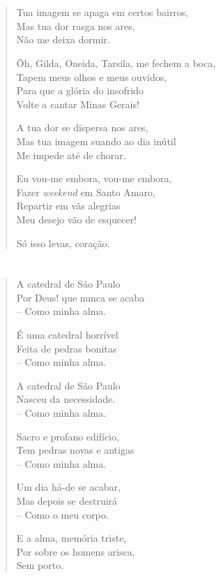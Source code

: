 \chapter*{}

\begin{verse}
Tua imagem se apaga em certos bairros,\\
Mas tua dor rasga nos ares,\\
Não me deixa dormir.

Ôh, Gilda, Oneida, Tarsila, me fechem a boca,\\
Tapem meus olhos e meus ouvidos,\\
Para que a glória do insofrido\\
Volte a cantar Minas Gerais!

A tua dor se dispersa nos ares,\\
Mas tua imagem suando ao dia inútil\\
Me impede até de chorar.

Eu vou-me embora, vou-me embora,\\
Fazer \emph{weekend} em Santo Amaro,\\
Repartir em vãs alegrias\\
Meu desejo vão de esquecer!

Só isso levas, coração.
\end{verse}

\chapter*{}

\begin{verse}
A catedral de São Paulo\\
Por Deus! que nunca se acaba\\
-- Como minha alma.

É uma catedral horrível\\
Feita de pedras bonitas\\
-- Como minha alma.

A catedral de São Paulo\\
Nasceu da necessidade.\\
-- Como minha alma.

Sacro e profano edifício,\\
Tem pedras novas e antigas\\
-- Como minha alma.

Um dia há-de se acabar,\\
Mas depois se destruirá\\
-- Como o meu corpo.

E a alma, memória triste,\\
Por sobre os homens arisca,\\
Sem porto.
\end{verse}

